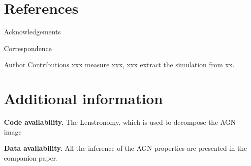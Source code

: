 \documentclass{natureprintstyle}
\newcommand{\lenstronomy}{{\sc Lenstronomy}}
\begin{document}
\section*{References}
 


\begin{addendum}
 \item[Acknowledgements] 

%
\item[Correspondence] %
\item[Author Contributions] xxx measure xxx, xxx extract the simulation from xx.
\end{addendum}

\section*{Additional information}
\textbf{Code availability.} The \lenstronomy, which is used to decompose the AGN image  

\textbf{Data availability.} All the inference of the AGN properties are presented in the companion paper.


\end{document}
